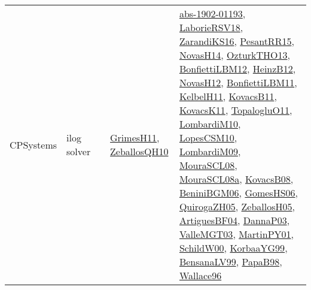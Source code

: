 {\begin{longtable}{lp{3cm}>{\raggedright}p{6cm}>{\raggedright}p{6cm}p{8cm}}
CPSystems & ilog solver &  & \href{papers/GrimesH11.pdf}{GrimesH11}\cite{GrimesH11}, \href{articles/ZeballosQH10.pdf}{ZeballosQH10}\cite{ZeballosQH10} & \href{articles/abs-1902-01193.pdf}{abs-1902-01193}\cite{abs-1902-01193}, \href{articles/LaborieRSV18.pdf}{LaborieRSV18}\cite{LaborieRSV18}, \href{articles/ZarandiKS16.pdf}{ZarandiKS16}\cite{ZarandiKS16}, \href{papers/PesantRR15.pdf}{PesantRR15}\cite{PesantRR15}, \href{articles/NovasH14.pdf}{NovasH14}\cite{NovasH14}, \href{articles/OzturkTHO13.pdf}{OzturkTHO13}\cite{OzturkTHO13}, \href{papers/BonfiettiLBM12.pdf}{BonfiettiLBM12}\cite{BonfiettiLBM12}, \href{papers/HeinzB12.pdf}{HeinzB12}\cite{HeinzB12}, \href{articles/NovasH12.pdf}{NovasH12}\cite{NovasH12}, \href{papers/BonfiettiLBM11.pdf}{BonfiettiLBM11}\cite{BonfiettiLBM11}, \href{articles/KelbelH11.pdf}{KelbelH11}\cite{KelbelH11}, \href{articles/KovacsB11.pdf}{KovacsB11}\cite{KovacsB11}, \href{articles/KovacsK11.pdf}{KovacsK11}\cite{KovacsK11}, \href{articles/TopalogluO11.pdf}{TopalogluO11}\cite{TopalogluO11}, \href{papers/LombardiM10.pdf}{LombardiM10}\cite{LombardiM10}, \href{articles/LopesCSM10.pdf}{LopesCSM10}\cite{LopesCSM10}, \href{papers/LombardiM09.pdf}{LombardiM09}\cite{LombardiM09}, \href{papers/MouraSCL08.pdf}{MouraSCL08}\cite{MouraSCL08}, \href{papers/MouraSCL08a.pdf}{MouraSCL08a}\cite{MouraSCL08a}, \href{articles/KovacsB08.pdf}{KovacsB08}\cite{KovacsB08}, \href{papers/BeniniBGM06.pdf}{BeniniBGM06}\cite{BeniniBGM06}, \href{papers/GomesHS06.pdf}{GomesHS06}\cite{GomesHS06}, \href{papers/QuirogaZH05.pdf}{QuirogaZH05}\cite{QuirogaZH05}, \href{articles/ZeballosH05.pdf}{ZeballosH05}\cite{ZeballosH05}, \href{papers/ArtiguesBF04.pdf}{ArtiguesBF04}\cite{ArtiguesBF04}, \href{papers/DannaP03.pdf}{DannaP03}\cite{DannaP03}, \href{papers/ValleMGT03.pdf}{ValleMGT03}\cite{ValleMGT03}, \href{articles/MartinPY01.pdf}{MartinPY01}\cite{MartinPY01}, \href{articles/SchildW00.pdf}{SchildW00}\cite{SchildW00}, \href{papers/KorbaaYG99.pdf}{KorbaaYG99}\cite{KorbaaYG99}, \href{articles/BensanaLV99.pdf}{BensanaLV99}\cite{BensanaLV99}, \href{articles/PapaB98.pdf}{PapaB98}\cite{PapaB98}, \href{articles/Wallace96.pdf}{Wallace96}\cite{Wallace96}\\

\end{longtable}}
